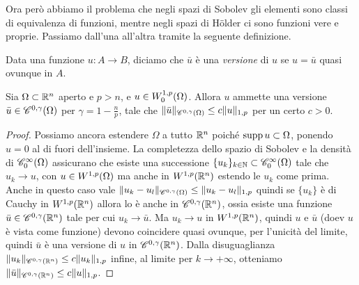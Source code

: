 Ora però abbiamo il problema che negli spazi di Sobolev gli elementi sono classi di equivalenza di funzioni, mentre negli spazi di Hölder ci sono funzioni vere e proprie.
Passiamo dall'una all'altra tramite la seguente definizione.
\begin{definizione} \label{d:versione}
    Data una funzione $u\colon A\to B$, diciamo che $\bar{u}$ è una \emph{versione} di $u$ se $u=\bar{u}$ quasi ovunque in $A$.
\end{definizione}
\begin{teorema} \label{t:versione-holder-continua}
    Sia $\Omega\subset\R^n$ aperto e $p>n$, e $u\in\sobWc[1,p]{\Omega}$.
    Allora $u$ ammette una versione $\bar{u}\in\cont[0,\gamma]{\Omega}$ per $\gamma=1-\frac{n}{p}$, tale che $\norm{\bar{u}}_{\cont[0,\gamma]{\Omega}}\le c\norm{u}_{1,p}$ per un certo $c>0$.
\end{teorema}
\begin{proof}
   Possiamo ancora estendere $\Omega$ a tutto $\R^n$ poich\'e $\supp u\subset\Omega$, ponendo $u=0$ al di fuori dell'insieme.
   La completezza dello spazio di Sobolev e la densità di $\contsc[\infty]{\Omega}$ assicurano che esiste una successione $\{u_k\}_{k\in\N}\subset\contsc[\infty]{\Omega}$ tale che $u_k\to u$, con $u\in\sobW[1,p]{\Omega}$ ma anche in $\sobW[1,p]{\R^n}$ estendo le $u_k$ come prima.
   Anche in questo caso vale $\norm{u_k-u_l}_{\cont[0,\gamma]{\Omega}}\le\norm{u_k-u_l}_{1,p}$ quindi se $\{u_k\}$ è di Cauchy in $\sobW[1,p]{\R^n}$ allora lo è anche in $\cont[0,\gamma]{\R^n}$, ossia esiste una funzione $\bar{u}\in\cont[0,\gamma]{\R^n}$ tale per cui $u_k\to\bar{u}$.
   Ma $u_k\to u$ in $\sobW[1,p]{\R^n}$, quindi $u$ e $\bar{u}$ (doev $u$ è vista come funzione) devono coincidere quasi ovunque, per l'unicità del limite, quindi $\bar{u}$ è una versione di $u$ in $\cont[0,\gamma]{\R^n}$.
   Dalla disuguaglianza $\norm{u_k}_{\cont[0,\gamma]{\R^n}}\le c\norm{u_k}_{1,p}$ infine, al limite per $k\to+\infty$, otteniamo $\norm{\bar{u}}_{\cont[0,\gamma]{\R^n}}\le c\norm{u}_{1,p}$.
\end{proof}

